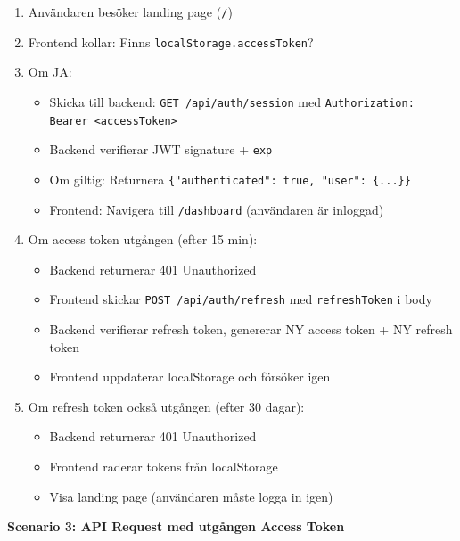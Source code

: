\documentclass[12pt,a4paper]{article}
\begin{document}
\begin{enumerate}[noitemsep]
  \item Användaren besöker landing page (\texttt{/})
  \item Frontend kollar: Finns \texttt{localStorage.accessToken}?
  \item Om JA:
    \begin{itemize}[noitemsep]
      \item Skicka till backend: \texttt{GET /api/auth/session} med \texttt{Authorization: Bearer <accessToken>}
      \item Backend verifierar JWT signature + \texttt{exp}
      \item Om giltig: Returnera \texttt{\{"authenticated": true, "user": \{...\}\}}
      \item Frontend: Navigera till \texttt{/dashboard} (användaren är inloggad)
    \end{itemize}
  \item Om access token utgången (efter 15 min):
    \begin{itemize}[noitemsep]
      \item Backend returnerar 401 Unauthorized
      \item Frontend skickar \texttt{POST /api/auth/refresh} med \texttt{refreshToken} i body
      \item Backend verifierar refresh token, genererar NY access token + NY refresh token
      \item Frontend uppdaterar localStorage och försöker igen
    \end{itemize}
  \item Om refresh token också utgången (efter 30 dagar):
    \begin{itemize}[noitemsep]
      \item Backend returnerar 401 Unauthorized
      \item Frontend raderar tokens från localStorage
      \item Visa landing page (användaren måste logga in igen)
    \end{itemize}
\end{enumerate}

\textbf{Scenario 3: API Request med utgången Access Token}
\end{document}
